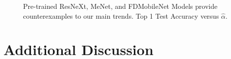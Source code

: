{\begin{figure}[!htb]
{      \label{fig:menet-net}
   }
   \caption{
      Pre-trained 
      ResNeXt, MeNet, and FDMobileNet
      Models 
      provide counterexamples to our main trends.
      Top 1 Test Accuracy versus
      $\hat{\alpha}$.
           }
   \label{fig:counter-examples}
\end{figure}


\section{Additional Discussion}
\label{sxn:appendix-addl-discussion}

}

